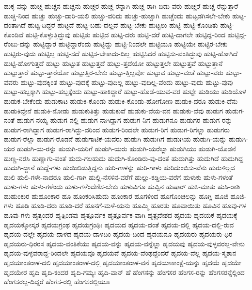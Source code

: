 {ಹುಕ್ಕ-ವನ್ನು
ಹುಚ್ಚ
ಹುಚ್ಚನ
ಹುಚ್ಚನು
ಹುಚ್ಚರ
ಹುಚ್ಚ-ರನ್ನಾಗಿ
ಹುಚ್ಚ-ರಾಗಿ-ಬಿಡು-ವರು
ಹುಚ್ಚರೆ
ಹುಚ್ಚ-ರೆನ್ನುತ್ತಾರೆ
ಹುಚ್ಚಿ-ನಿಂದ
ಹುಚ್ಚು
ಹುಚ್ಚು-ದಾರಿ-ಯಲಿ
ಹುಚ್ಚು-ವರಿದು
ಹುಚ್ಚು-ಹುಚ್ಚಾಗಿ
ಹುಚ್ಚೆಂದು
ಹುಟ್ಟಡಗಿಸಲೇ-ಬೇಕು
ಹುಟ್ಟ-ದಂತಾಗಿದೆ
ಹುಟ್ಟ-ದಿದ್ದರೆ
ಹುಟ್ಟದೆ
ಹುಟ್ಟ-ಬಹು-ದಲ್ಲವೆ
ಹುಟ್ಟ-ಬೇಕು
ಹುಟ್ಟಲು
ಹುಟ್ಟಿ
ಹುಟ್ಟಿ-ಕೊಂಡಿತು
ಹುಟ್ಟಿ-ಕೊಂಡಿವೆ
ಹುಟ್ಟಿ-ಕೊಳ್ಳುತ್ತಿದ್ದುವು
ಹುಟ್ಟಿತು
ಹುಟ್ಟಿದ
ಹುಟ್ಟಿ-ದರು
ಹುಟ್ಟಿ-ದರೆ
ಹುಟ್ಟಿ-ದಾಗಲೇ
ಹುಟ್ಟಿದ್ದ-ರಿಂದ
ಹುಟ್ಟಿದ್ದ-ರೆಂಬು-ದನ್ನು
ಹುಟ್ಟಿದ್ದಾರೆ
ಹುಟ್ಟಿದ್ದಾರೆಂದು
ಹುಟ್ಟಿದ್ದು
ಹುಟ್ಟಿ-ನಿಂದಲೇ
ಹುಟ್ಟಿಯೂ
ಹುಟ್ಟಿಯೇ
ಹುಟ್ಟಿರ-ಬೇಕು
ಹುಟ್ಟಿರು-ವುದು
ಹುಟ್ಟಿಲ್ಲ
ಹುಟ್ಟಿ-ಸದೆ
ಹುಟ್ಟಿಸ-ಬೇಕಾದು-ದಿಲ್ಲ
ಹುಟ್ಟಿಸಿದರೆ
ಹುಟ್ಟಿಸು-ವಂತಿದ್ದುವು
ಹುಟ್ಟಿ-ಹೋಗಿದೆ
ಹುಟ್ಟಿ-ಹೋಗುತ್ತದೆ
ಹುಟ್ಟು
ಹುಟ್ಟುತ
ಹುಟ್ಟುತ್ತದೆ
ಹುಟ್ಟು-ತ್ತದೆಯೋ
ಹುಟ್ಟುತ್ತಲೇ
ಹುಟ್ಟುತ್ತವೆ
ಹುಟ್ಟುತ್ತಾನೆ
ಹುಟ್ಟುತ್ತಾರೆ
ಹುಟ್ಟು-ತ್ತಾರೆಯೋ
ಹುಟ್ಟುತ್ತಿರ-ಬೇಕು
ಹುಟ್ಟು-ತ್ತಿಲ್ಲವೋ
ಹುಟ್ಟುವ
ಹುಟ್ಟು-ವಂತೆ
ಹುಟ್ಟು-ವರು
ಹುಟ್ಟು-ವವರು
ಹುಟ್ಟು-ವುದಕ್ಕಿಂತ
ಹುಟ್ಟು-ವುದಕ್ಕೆ
ಹುಟ್ಟು-ವುದಿಲ್ಲ
ಹುಟ್ಟು-ವುದಿಲ್ಲ-ವೆಂದು
ಹುಟ್ಟು-ವುದು
ಹುಟ್ಟು-ವುವು
ಹುಟ್ಟು-ಹಬ್ಬಕ್ಕಾಗಿ
ಹುಟ್ಟು-ಹಬ್ಬಕ್ಕೆಂದು
ಹುಟ್ಟು-ಹಾಕಿದ್ದಾರೆ
ಹುಟ್ಟು-ಹೊಡೆ-ಯುವ-ವರ
ಹುಟ್ಟೇ
ಹುಡಿಯು
ಹುಡಿಯೊಳ
ಹುಡುಕ-ಬೇಕೆಂದು
ಹುಡುಕಾಟ
ಹುಡುಕಿ-ಕೊಂಡು
ಹುಡುಕಿ-ಕೊಂಡು-ಹೋಗೋಣ
ಹುಡುಕಿ-ದರೂ
ಹುಡುಕಿ-ದೆನು
ಹುಡುಕಿದ್ದೇನೆ
ಹುಡುಕಿ-ನೋಡು
ಹುಡುಕುತಿತ್ತು
ಹುಡುಕುವೆ
ಹುಡುಕು-ವೆಯ-ವನ
ಹುಡುಕು-ವೆವು
ಹುಡುಗ
ಹುಡುಗ-ನಂತೆ
ಹುಡುಗ-ನಯ್ಯ
ಹುಡುಗ-ನಲ್ಲಿ
ಹುಡುಗ-ನಾಗಿದ್ದಾಗ
ಹುಡುಗ-ನಿಗೆ
ಹುಡುಗನೂ
ಹುಡುಗರ
ಹುಡುಗ-ರನ್ನು
ಹುಡುಗ-ರಾಗಿದ್ದಾಗ
ಹುಡುಗ-ರಾಗಿದ್ದು-ದರಿಂದ
ಹುಡುಗ-ರಿಂದಲೇ
ಹುಡುಗ-ರಿಗೆ
ಹುಡುಗ-ರಿಗೆಲ್ಲಾ
ಹುಡುಗರು
ಹುಡುಗ-ರೆಲ್ಲಾ
ಹುಡುಗ-ರೊಡನೆ
ಹುಡುಗಾಟಿಕೆ-ಯವರು
ಹುಡುಗಿ
ಹುಡುಗಿಗೆ
ಹುಡುಗಿಯ
ಹುಡುಗಿ-ಯನ್ನು
ಹುಡುಗಿ-ಯರ
ಹುಡುಗಿ-ಯ-ರನ್ನು
ಹುಡುಗಿ-ಯರಿಗೆ
ಹುಡುಗಿ-ಯರು
ಹುಡುಗಿ-ಯರೆಲ್ಲಾ
ಹುಡುಗಿಯು
ಹುಡುಗಿ-ಯೊಡನೆ
ಹುಣ್ಣ-ನರಸಿ
ಹುಣ್ಣಾಗು-ವಂತೆ
ಹುದು-ಗಲಹುದು
ಹುದುಗಿ-ಕೊಂಡಿರು-ವು-ದಂತೆ
ಹುದುಗಿತ್ತು
ಹುದುಗಿದೆ
ಹುದುಗಿದ್ದ
ಹುದುಗಿ-ದ್ದಾನೆ
ಹುದ್ದೆ-ಗಳು
ಹುಯಿಲಿಡುತ್ತಿದ್ದನು
ಹುರಿ-ಗಾಳನ್ನು
ಹುರಿ-ಗಾಳು
ಹುರಿದುಂಬಿಸು-ವೆನು
ಹುರುಳಿಲ್ಲದ
ಹುಲಿ
ಹುಲಿ-ಗಳೇ-ನಾದರೂ
ಹುಲಿ-ಗಾಗಿ
ಹುಲ್ಲಿ-ನೆಸಳಿನ-ವರೆಗೆ
ಹುಲ್ಲು-ಕಡ್ಡಿಯ-ವರೆಗೆ
ಹುಳುಕು
ಹುಳು-ಗಳಂತೆ
ಹುಳು-ಗಳು
ಹುಳು-ಗಳೆಂದು
ಹುಳು-ಗಳೆಂದೆಣಿಸ-ಬೇಕು
ಹುಳುವಿಗೂ
ಹುವ್ವಿನ
ಹುಷಾರ್
ಹುಸಿ-ಮಾತು
ಹುಸಿ-ರಾಶಿ
ಹುಹುಂಕುರ
ಹುಹೂಂಕಾರ
ಹೂ
ಹೂಂಕರಿಸಿಹುದು
ಹೂಂಕಾರ
ಹೂಗಳಿಂದ
ಹೂಗೊಂಚಲನ್ನು
ಹೂಗ್ಲಿ
ಹೂಜಿ
ಹೂಜಿ-ಗಳು
ಹೂಡಿ
ಹೂಡಿ-ದರು
ಹೂಡಿ-ದರೆ
ಹೂನಗೆ-ಮಳೆ-ಯನು
ಹೂಮ್ಮಿ
ಹೂರತು
ಹೂವಾಯಿತು
ಹೂವಿನ
ಹೂವು-ಗಳ
ಹೂವು-ಗಳು
ಹೃತ್ಕಂದರ
ಹೃತ್ಪಿಂಡವು
ಹೃತ್ಪೂರ್ವಕ
ಹೃತ್ಪೂರ್ವಕ-ವಾಗಿ
ಹೃತ್ಪ್ರದೇಶದ
ಹೃದಯ
ಹೃದಯಕೆ
ಹೃದಯಕ್ಕೆ
ಹೃದಯಕ್ಕೋಸ್ಕರ
ಹೃದಯಗ್ರಂಥ
ಹೃದಯಗ್ರಂಥಿಃ
ಹೃದಯದ
ಹೃದಯ-ದಂತೆ
ಹೃದಯ-ದಲ್ಲಿ
ಹೃದಯ-ದಲ್ಲಿ-ರುವ
ಹೃದಯ-ದಲ್ಲೇ
ಹೃದಯ-ದಾಳದ
ಹೃದಯ-ದಾಳದಿಂ
ಹೃದಯ-ದಿಂದ
ಹೃದಯನೂ
ಹೃದಯರು
ಹೃದಯರು-ಧಿರ
ಹೃದಯರು-ಧಿರರಸ
ಹೃದಯ-ವಂತಿಕೆಯು
ಹೃದಯ-ವನ್ನು
ಹೃದಯ-ವನ್ನೆಲ್ಲಾ
ಹೃದಯವು
ಹೃದಯ-ವುಳ್ಳವರಲ್ಲ-ವೇನು
ಹೃದಯ-ವುಳ್ಳವರಾದ್ದ-ರಿಂದಲೇ
ಹೃದಯವೂ
ಹೃದಯವೆ
ಹೃದಯ-ವೆಂಥದ್ದೆಂದರೆ
ಹೃದಯ-ವೆಲ್ಲ
ಹೃದಯ-ಸ್ಮಶಾನ
ಹೃದಯಾಂತರಾಳ-ದಲಿ
ಹೃದಯಾಂತರಾಳ-ದಲ್ಲಿ
ಹೃದಯಾಂತರಾಳ-ವನೆ
ಹೃದಯಾಕಾಂಕ್ಷೆ-ಯನ್ನು
ಹೃದಯೆ
ಹೃದಯೇ
ಹೃದಯೇರ
ಹೃದಿ
ಹೃದಿ-ಕಂದರ
ಹೃದಿ-ಗಮ್ಯಃ
ಹೃದಿ-ವಾನ್
ಹೆ
ಹೆಂಗಸನ್ನು
ಹೆಂಗಸರ
ಹೆಂಗಸ-ರನ್ನು
ಹೆಂಗಸರನ್ನೆಲ್ಲಿಂದ
ಹೆಂಗಸರಲ್ಲ-ದಿದ್ದರೆ
ಹೆಂಗಸ-ರಲ್ಲಿ
ಹೆಂಗಸರಲ್ಲಿಯೂ
}
